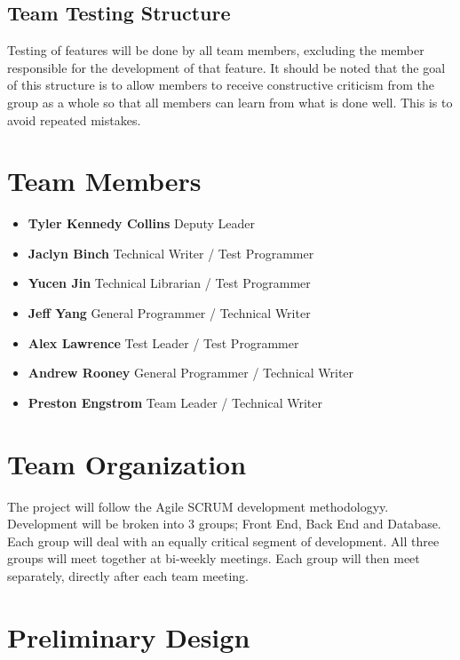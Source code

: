 \documentclass[]{article}
\begin{document}
\subsection{Team Testing Structure}
Testing of features will be done by all team members, excluding the member responsible for the development of that feature. It should be noted that the goal of this structure is to allow members to receive constructive criticism from the group as a whole so that all members can learn from what is done well. This is to avoid repeated mistakes.
\section{Team Members}
\begin{itemize}
	\item \textbf{Tyler Kennedy Collins} Deputy Leader
	\item \textbf{Jaclyn Binch} Technical Writer / Test Programmer
	\item \textbf{Yucen Jin} Technical Librarian / Test Programmer
	\item \textbf{Jeff Yang} General Programmer / Technical Writer
	\item \textbf{Alex Lawrence} Test Leader / Test Programmer
	\item \textbf{Andrew Rooney} General Programmer / Technical Writer
	\item \textbf{Preston Engstrom} Team Leader / Technical Writer
\end{itemize}

\section{Team Organization}
The project will follow the Agile SCRUM development methodologyy. Development will be broken into 3 groups; Front End, Back End and Database. Each group will deal with an equally critical segment of development. All three groups will meet together at bi-weekly meetings. Each group will then meet separately, directly after each team meeting.

\section{Preliminary Design}
\end{document}
